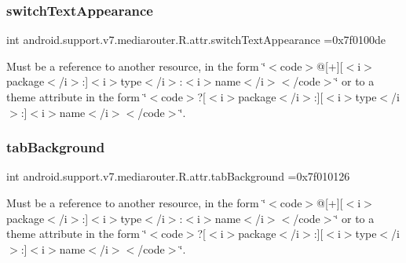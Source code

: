 \subsubsection{\texorpdfstring{switch\+Text\+Appearance}{switchTextAppearance}}
{\footnotesize\ttfamily int android.\+support.\+v7.\+mediarouter.\+R.\+attr.\+switch\+Text\+Appearance =0x7f0100de\hspace{0.3cm}{\ttfamily [static]}}

Must be a reference to another resource, in the form \char`\"{}$<$code$>$@\mbox{[}+\mbox{]}\mbox{[}$<$i$>$package$<$/i$>$\+:\mbox{]}$<$i$>$type$<$/i$>$\+:$<$i$>$name$<$/i$>$$<$/code$>$\char`\"{} or to a theme attribute in the form \char`\"{}$<$code$>$?\mbox{[}$<$i$>$package$<$/i$>$\+:\mbox{]}\mbox{[}$<$i$>$type$<$/i$>$\+:\mbox{]}$<$i$>$name$<$/i$>$$<$/code$>$\char`\"{}. \mbox{\label{classandroid_1_1support_1_1v7_1_1mediarouter_1_1R_1_1attr_aeb75b51613a16cdb79557607930714a1}} 
\subsubsection{\texorpdfstring{tab\+Background}{tabBackground}}
{\footnotesize\ttfamily int android.\+support.\+v7.\+mediarouter.\+R.\+attr.\+tab\+Background =0x7f010126\hspace{0.3cm}{\ttfamily [static]}}

Must be a reference to another resource, in the form \char`\"{}$<$code$>$@\mbox{[}+\mbox{]}\mbox{[}$<$i$>$package$<$/i$>$\+:\mbox{]}$<$i$>$type$<$/i$>$\+:$<$i$>$name$<$/i$>$$<$/code$>$\char`\"{} or to a theme attribute in the form \char`\"{}$<$code$>$?\mbox{[}$<$i$>$package$<$/i$>$\+:\mbox{]}\mbox{[}$<$i$>$type$<$/i$>$\+:\mbox{]}$<$i$>$name$<$/i$>$$<$/code$>$\char`\"{}. \mbox{\label{classandroid_1_1support_1_1v7_1_1mediarouter_1_1R_1_1attr_af723b082e7ee1fd2f3336ef0f0c67681}} 

